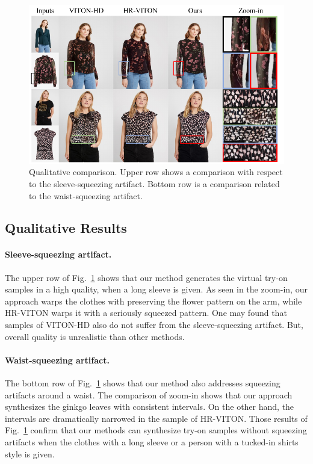 \documentclass[letterpaper]{article} %
\begin{document}
\begin{figure}[t]
    \centering
    \includegraphics[width=\linewidth]{fig/fig5.pdf}
    \caption{Qualitative comparison. Upper row shows a comparison with respect to the sleeve-squeezing artifact. Bottom row is a comparison related to the waist-squeezing artifact.
    }
    \label{qualitative_twocol_res}
\end{figure}

\subsection{Qualitative Results}

\paragraph{Sleeve-squeezing artifact.} The upper row of Fig.~\ref{qualitative_twocol_res} shows that our method generates the virtual try-on samples in a high quality, when a long sleeve is given.
As seen in the zoom-in, our approach warps the clothes with preserving the flower pattern on the arm, while HR-VITON warps it with a seriously squeezed pattern.
One may found that samples of VITON-HD also do not suffer from the sleeve-squeezing artifact.
But, overall quality is unrealistic than other methods.

\paragraph{Waist-squeezing artifact.} The bottom row of Fig.~\ref{qualitative_twocol_res} shows that our method also addresses squeezing artifacts around a waist.
The comparison of zoom-in shows that our approach synthesizes the ginkgo leaves with consistent intervals.
On the other hand, the intervals are dramatically narrowed in the sample of HR-VITON.
Those results of Fig.~\ref{qualitative_twocol_res} confirm that our methods can synthesize try-on samples without squeezing artifacts when the clothes with a long sleeve or a person with a tucked-in shirts style is given.
\end{document}

